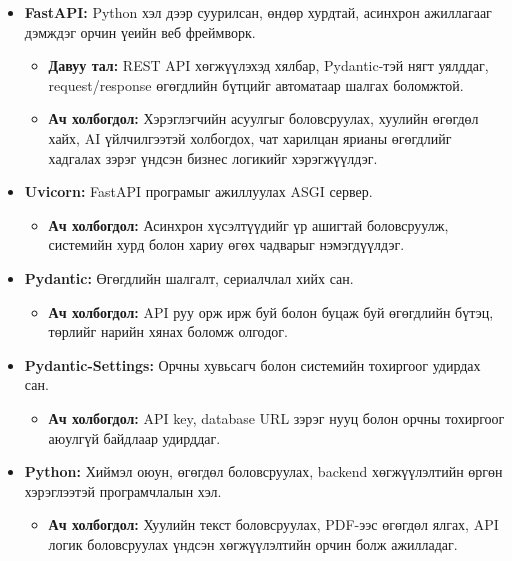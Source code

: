 \begin{itemize}

    \item \textbf{FastAPI:} Python хэл дээр суурилсан, өндөр хурдтай, асинхрон ажиллагааг дэмждэг орчин үеийн веб фреймворк.
    \begin{itemize}
        \item \textbf{Давуу тал:} REST API хөгжүүлэхэд хялбар, Pydantic-тэй нягт уялддаг, request/response өгөгдлийн бүтцийг автоматаар шалгах боломжтой.
        \item \textbf{Ач холбогдол:} Хэрэглэгчийн асуулгыг боловсруулах, хуулийн өгөгдөл хайх, AI үйлчилгээтэй холбогдох, чат харилцан ярианы өгөгдлийг хадгалах зэрэг үндсэн бизнес логикийг хэрэгжүүлдэг.
    \end{itemize}

    \item \textbf{Uvicorn:} FastAPI програмыг ажиллуулах ASGI сервер.
    \begin{itemize}
        \item \textbf{Ач холбогдол:} Асинхрон хүсэлтүүдийг үр ашигтай боловсруулж, системийн хурд болон хариу өгөх чадварыг нэмэгдүүлдэг.
    \end{itemize}

    \item \textbf{Pydantic:} Өгөгдлийн шалгалт, сериалчлал хийх сан.
    \begin{itemize}
        \item \textbf{Ач холбогдол:} API руу орж ирж буй болон буцаж буй өгөгдлийн бүтэц, төрлийг нарийн хянах боломж олгодог.
    \end{itemize}

    \item \textbf{Pydantic-Settings:} Орчны хувьсагч болон системийн тохиргоог удирдах сан.
    \begin{itemize}
        \item \textbf{Ач холбогдол:} API key, database URL зэрэг нууц болон орчны тохиргоог аюулгүй байдлаар удирддаг.
    \end{itemize}

    \item \textbf{Python:} Хиймэл оюун, өгөгдөл боловсруулах, backend хөгжүүлэлтийн өргөн хэрэглээтэй програмчлалын хэл.
    \begin{itemize}
        \item \textbf{Ач холбогдол:} Хуулийн текст боловсруулах, PDF-ээс өгөгдөл ялгах, API логик боловсруулах үндсэн хөгжүүлэлтийн орчин болж ажилладаг.
    \end{itemize}

\end{itemize}

